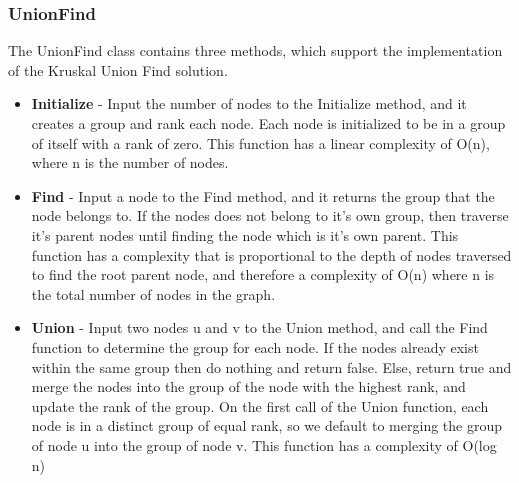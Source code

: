 	\subsubsection{UnionFind}
	The UnionFind class contains three methods, which support the implementation of the Kruskal Union Find solution. 
	\begin{itemize}
    \item \textbf{Initialize} - Input the number of nodes to the Initialize method, and it creates a group and rank each node. Each node is initialized to be in a group of itself with a rank of zero. This function has a linear complexity of O(n), where n is the number of nodes.  
    \item \textbf{Find} - Input a node to the Find method, and it returns the group that the node belongs to. If the nodes does not belong to it's own group, then traverse it's parent nodes until finding the node which is it's own parent. This function has a complexity that is proportional to the depth of nodes traversed to find the root parent node, and therefore a complexity of O(n) where n is the total number of nodes in the graph. 
    \item \textbf{Union} - Input two nodes u and v to the Union method, and call the Find function to determine the group for each node. If the nodes already exist within the same group then do nothing and return false. Else, return true and merge the nodes into the group of the node with the highest rank, and update the rank of the group. On the first call of the Union function, each node is in a distinct group of equal rank, so we default to merging the group of node u into the group of node v. This function has a complexity of O(log n)
    \end{itemize}
		

